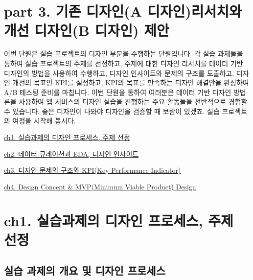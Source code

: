 \documentclass[
  letterpaper,
]{book}
\begin{document}
\chapter*{part 3. 기존 디자인(A 디자인)리서치와 개선 디자인(B 디자인)
제안}\label{part-3.-uxae30uxc874-uxb514uxc790uxc778a-uxb514uxc790uxc778uxb9acuxc11cuxce58uxc640-uxac1cuxc120-uxb514uxc790uxc778b-uxb514uxc790uxc778-uxc81cuxc548}


이번 단원은 실습 프로젝트의 디자인 부분을 수행하는 단원입니다. 각 실습
과제들을 통하여 실습 프로젝트의 주제를 선정하고, 주제에 대한 디자인
리서치를 데이터 기반 디자인의 방법을 사용하여 수행하고, 디자인
인사이트와 문제의 구조를 도출하고, 디자인 개선의 목표인 KPI를 설정하고,
KPI의 목표를 만족하는 디자인 해결안을 완성하여 A/B 테스팅 준비를
마칩니다. 이번 단원을 통하여 여러분은 데이터 기반 디자인 방법론을
사용하여 앱 서비스의 디자인 실습을 진행하는 주요 활동들을 전반적으로
경험할 수 있습니다. 좋은 디자인이 나와야 디자인을 검증할 때 보람이
있겠죠. 실습 프로젝트의 여정을 시작해 봅시다.

\href{ch1.\%20실습과제의\%20디자인\%20프로세스,\%20주제\%20선정.qmd}{ch1.
실습과제의 디자인 프로세스, 주제 선정}

\href{ch2.\%20데이터\%20큐레이션과\%20EDA,\%20디자인\%20인사이트.qmd}{ch2.
데이터 큐레이션과 EDA, 디자인 인사이트}

\href{ch3.\%20디자인\%20문제의\%20구조와\%20KPI.qmd}{ch3. 디자인 문제의
구조와 KPI(Key Performance Indicator)}

\href{ch4.\%20Design\%20Concept\%20&\%20MVP(Minimum\%20Viable\%20Product)\%20Design.qmd}{ch4.
Design Concept \& MVP(Minimum Viable Product) Design}

\chapter{ch1. 실습과제의 디자인 프로세스, 주제
선정}\label{ch1.-uxc2e4uxc2b5uxacfcuxc81cuxc758-uxb514uxc790uxc778-uxd504uxb85cuxc138uxc2a4-uxc8fcuxc81c-uxc120uxc815}

\section{실습 과제의 개요 및 디자인
프로세스}\label{uxc2e4uxc2b5-uxacfcuxc81cuxc758-uxac1cuxc694-uxbc0f-uxb514uxc790uxc778-uxd504uxb85cuxc138uxc2a4}
\end{document}
